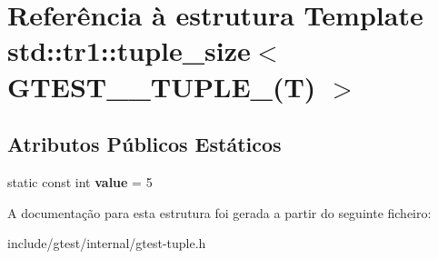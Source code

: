 \hypertarget{structstd_1_1tr1_1_1tuple__size_3_01GTEST__5__TUPLE___07T_08_01_4}{\section{Referência à estrutura Template std\-:\-:tr1\-:\-:tuple\-\_\-size$<$ G\-T\-E\-S\-T\-\_\-\_\-\-T\-U\-P\-L\-E\-\_\-(T) $>$}
\label{structstd_1_1tr1_1_1tuple__size_3_01GTEST__5__TUPLE___07T_08_01_4}
}
\subsection*{Atributos Públicos Estáticos}
\begin{DoxyCompactItemize}
\item 
\hypertarget{structstd_1_1tr1_1_1tuple__size_3_01GTEST__5__TUPLE___07T_08_01_4_a83d207f8b8e95d9b747a586550feefcb}{static const int {\bfseries value} = 5}\label{structstd_1_1tr1_1_1tuple__size_3_01GTEST__5__TUPLE___07T_08_01_4_a83d207f8b8e95d9b747a586550feefcb}

\end{DoxyCompactItemize}


A documentação para esta estrutura foi gerada a partir do seguinte ficheiro\-:\begin{DoxyCompactItemize}
\item 
include/gtest/internal/gtest-\/tuple.\-h\end{DoxyCompactItemize}
